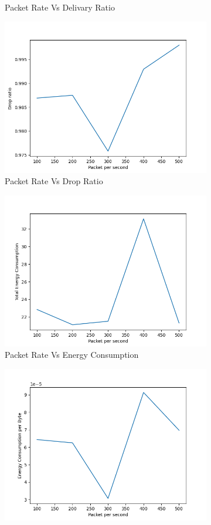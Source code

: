 \begin{figure}[h]
\begin{subfigure}{.5\textwidth}
     \caption{Packet Rate Vs Delivary Ratio}
     \label{packet_rate_delivery}
\end{subfigure}
\begin{subfigure}{.5\textwidth}
  \centering
  \includegraphics[width=.8\linewidth]{_15_4_static/PacketpersecondvsDropRatio.png}
     \caption{Packet Rate Vs Drop Ratio}
     \label{packet_rate_drop}
\end{subfigure}
\begin{subfigure}{.5\textwidth}
  \centering
  \includegraphics[width=.8\linewidth]{_15_4_static/PacketpersecondvsTotalEnergyConsumption.png}
     \caption{Packet Rate Vs Energy Consumption}
     \label{packet_rate_energy}
\end{subfigure}
\begin{subfigure}{.5\textwidth}
  \centering
  \includegraphics[width=.8\linewidth]{_15_4_static/PacketpersecondvsEnergyConsumptionperByte.png}

\end{subfigure}
\end{figure}

